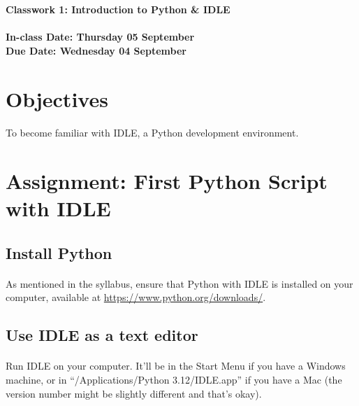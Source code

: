 \documentclass[letter,10pt]{article}
\begin{document}
    \huge
    \textbf{Classwork 1: Introduction to Python \& IDLE}
    \normalsize
    \\ ~~ \\
    \textbf{In-class Date: Thursday 05 September} \\
    \textbf{Due Date: Wednesday 04 September}
    
    \section*{Objectives}
    \paragraph{}To become familiar with IDLE, a Python development environment.
    
    \section*{Assignment: First Python Script with IDLE}
    \subsection{Install Python}
    \paragraph{}As mentioned in the syllabus, ensure that Python with IDLE is installed on your computer, available at \url{https://www.python.org/downloads/}.
    
    \subsection{Use IDLE as a text editor}
    \paragraph{}Run IDLE on your computer. It'll be in the Start Menu if you have a Windows machine, or in ``/Applications/Python 3.12/IDLE.app'' if you have a Mac (the version number might be slightly different and that's okay).
    
\end{document}
